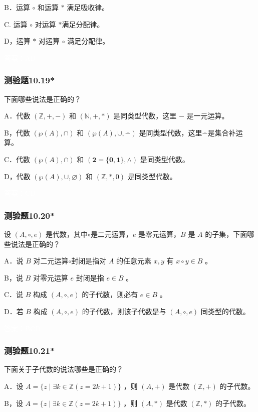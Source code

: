 \documentclass[UTF8, heading=true]{ctexart}
\begin{document}
B．运算 $\circ$ 和运算 $*$ 满足吸收律。

C. 运算 $\circ$ 对运算 $*$满足分配律。

D，运算 $*$ 对运算 $\circ$ 满足分配律。

\textcolor{white}{答案：AD}

\subsubsection{测验题10.19*}

下面哪些说法是正确的？

A．代数 $(\mathbb{Z},+,-)$ 和 $(\mathbb{N},+, *)$ 是同类型代数，这里 $-$ 是一元运算。

B，代数 $(\wp(A), \cap)$ 和 $(\wp(A), \cup, \overline{-})$ 是同类型代数，这里$\overline{-}$是集合补运算。

C．代数 $(\wp(A), \cap)$ 和 $(\mathbf{2}=\{\mathbf{0}, \mathbf{1}\}, \wedge)$ 是同类型代数。

D，代数 $(\wp(A), \cup, \varnothing)$ 和 $(\mathbb{Z}, *, 0)$ 是同类型代数。

\textcolor{white}{答案：CD}

\subsubsection{测验题10.20*}

设 $(A, \circ, e)$ 是代数，其中$\circ$是二元运算，$e$ 是零元运算，$B$ 是 $A$ 的子集，下面哪些说法是正确的？

A．说 $B$ 对二元运算$\circ$封闭是指对 $A$ 的任意元素 $x, y$ 有 $x \circ y \in B$ 。

B，说 $B$ 对零元运算 $e$ 封闭是指 $e \in B$ 。

C．说 $B$ 构成 $(A, \circ, e)$ 的子代数，则必有 $e \in B$ 。

D．若 $B$ 构成 $(A, \circ, e)$ 的子代数，则该子代数是与 $(A, \circ, e)$ 同类型的代数。

\textcolor{white}{答案：BCD}

\subsubsection{测验题10.21*}

下面关于子代数的说法哪些是正确的？

A．设 $A=\{z \mid \exists k \in \mathbb{Z}(z=2 k+1)\}$ ，则 $(A,+)$ 是代数 $(\mathbb{Z},+)$ 的子代数。

B，设 $A=\{z \mid \exists k \in \mathbb{Z}(z=2 k+1)\}$ ，则 $(A, *)$ 是代数 $(\mathbb{Z}, *)$ 的子代数。
\end{document}
